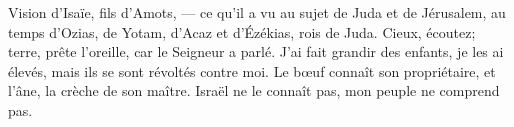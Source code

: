 Vision d’Isaïe, fils d’Amots,
	--- ce qu’il a vu au sujet de Juda et de Jérusalem,
	au temps d’Ozias, de Yotam, d’Acaz et d’Ézékias, rois de Juda.
Cieux, écoutez;
	terre, prête l’oreille,
	car le Seigneur a parlé.
J’ai fait grandir des enfants, je les ai élevés,
	mais ils se sont révoltés contre moi.
Le bœuf connaît son propriétaire, et l’âne, la crèche de son maître.
	Israël ne le connaît pas, mon peuple ne comprend pas.
